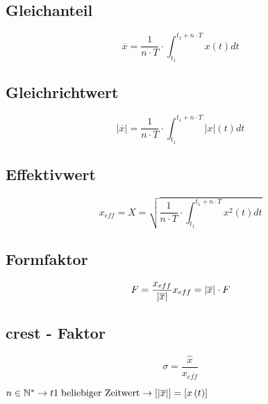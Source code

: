 \begin{multicols}{2}{}
\subsection*{Gleichanteil}
\[ \overline{x} = \frac{1}{n \cdot T} \cdot \int_{t_{1}}^{t_{1} + n \cdot T} x \left( t \right) dt \]

\subsection*{Gleichrichtwert}
\[ \left| \overline{x} \right| = \frac{1}{n \cdot T} \cdot 
\int_{t_{1}}^{t_{1} + n \cdot T} \left| x \right| \left( t \right) dt\]

\subsection*{Effektivwert}
\[ x_{eff} = X = \sqrt{ \frac{1}{n \cdot T} \cdot \int_{t_{1}}^{t_{1} + n \cdot T} x^2 \left( t \right) dt} \]

\subsection*{Formfaktor}
\[F = \frac{x_{eff}}{\left|\overline{x}\right|} \\ 
x_{eff} = \left|\overline{x}\right| \cdot F \]

\subsection*{crest - Faktor}
\[ \sigma = \frac{\hat{x}}{x_{eff}} \]
\hfill
\end{multicols}

\begin{center}
\(n \in \mathbb{N}^* \rightarrow
t1 \; \text{beliebiger Zeitwert} \rightarrow
\left[|\overline{x} \right|] = \left[ x\left( t \right) \right] \) 
\end{center}

